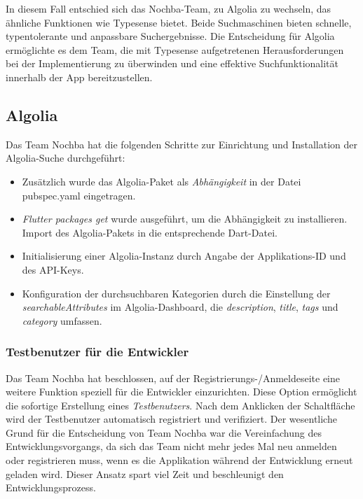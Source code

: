 In diesem Fall entschied sich das Nochba-Team, zu Algolia zu wechseln, das ähnliche Funktionen wie Typesense bietet. Beide Suchmaschinen bieten schnelle, typentolerante und anpassbare Suchergebnisse. Die Entscheidung für Algolia ermöglichte es dem Team, die mit Typesense aufgetretenen Herausforderungen bei der Implementierung zu überwinden und eine effektive Suchfunktionalität innerhalb der App bereitzustellen.

\subsection{Algolia}

Das Team Nochba hat die folgenden Schritte zur Einrichtung und Installation der Algolia-Suche durchgeführt:

\begin{itemize}
  \item {Zusätzlich wurde das Algolia-Paket als \textit{Abhängigkeit} in der Datei pubspec.yaml eingetragen.}
  \item {\textit{Flutter packages get} wurde ausgeführt, um die Abhängigkeit zu installieren.
        Import des Algolia-Pakets in die entsprechende Dart-Datei.}
  \item {Initialisierung einer Algolia-Instanz durch Angabe der Applikations-ID und des API-Keys.}
  \item {Konfiguration der durchsuchbaren Kategorien durch die Einstellung der \textit{searchableAttributes} im Algolia-Dashboard, die \textit{description}, \textit{title}, \textit{tags} und \textit{category} umfassen.}
\end{itemize}


\subsubsection{Testbenutzer für die Entwickler}

Das Team Nochba hat beschlossen, auf der Registrierungs-/Anmeldeseite eine weitere Funktion speziell für die Entwickler einzurichten. Diese Option ermöglicht die sofortige Erstellung eines \textit{Testbenutzers}. Nach dem Anklicken der Schaltfläche wird der Testbenutzer automatisch registriert und verifiziert. Der wesentliche Grund für die Entscheidung von Team Nochba war die Vereinfachung des Entwicklungsvorgangs, da sich das Team nicht mehr jedes Mal neu anmelden oder registrieren muss, wenn es die Applikation während der Entwicklung erneut geladen wird. Dieser Ansatz spart viel Zeit und beschleunigt den Entwicklungsprozess.


